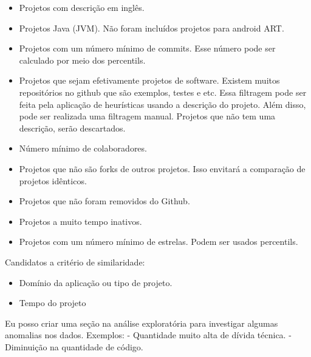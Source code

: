 \begin{itemize}
\item Projetos com descrição em inglês.
\item Projetos Java (JVM). Não foram incluídos projetos para android ART.
\item Projetos com um número mínimo de commits. Esse número pode ser calculado por meio dos percentils. 
\item Projetos que sejam efetivamente projetos de software. Existem muitos repositórios no github que são exemplos, testes  e etc. Essa filtragem pode ser feita pela aplicação de heurísticas usando a descrição do projeto. Além disso, pode ser realizada uma filtragem manual. Projetos que não tem uma descrição, serão descartados.
\item Número mínimo de colaboradores.
\item Projetos que não são forks de outros projetos. Isso envitará a comparação de projetos idênticos. 
\item Projetos que não foram removidos do Github.
\item Projetos a muito tempo inativos.
\item Projetos com um número mínimo de estrelas. Podem ser usados percentils.


\end{itemize}

Candidatos a critério de similaridade:

\begin{itemize}
\item Domínio da aplicação ou tipo de projeto.
\item Tempo do projeto
\end{itemize}

\label{capitulo:similaridade}

Eu posso criar uma seção na análise exploratória para investigar algumas anomalias nos dados. Exemplos:
- Quantidade muito alta de dívida técnica.
- Diminuição na quantidade  de código.